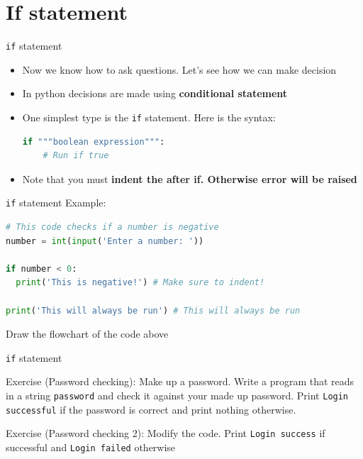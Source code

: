 \documentclass[10pt,xcolor={table,dvipsnames},t]{beamer}
\begin{document}
\section{If statement}
\begin{frame}[fragile]{\texttt{if} statement}
  \begin{itemize}
    \item Now we know how to ask questions. Let's see how we can make decision
    \item In python decisions are made using \textbf{conditional statement}
    \item One simplest type is the \texttt{if} statement. Here is the syntax:
\begin{lstlisting}[language=python]
  if """boolean expression""":
    # Run if true
\end{lstlisting}
    \item Note that you must \textbf{indent the after if. Otherwise error will be raised}
  \end{itemize}
\end{frame}

\begin{frame}[fragile]{\texttt{if} statement}
  Example:
\begin{lstlisting}[language=python]
# This code checks if a number is negative
number = int(input('Enter a number: '))

if number < 0:
  print('This is negative!') # Make sure to indent!

print('This will always be run') # This will always be run
\end{lstlisting}
Draw the flowchart of the code above
\end{frame}
\begin{frame}{\texttt{if} statement}
  \begin{exampleblock}{Exercise (Password checking):}
    Make up a password. Write a program that reads in a string \texttt{password} and check it against your made up password. Print \texttt{Login successful} if the password is correct and print nothing otherwise.
  \end{exampleblock}
  \begin{exampleblock}{Exercise (Password checking 2):}
    Modify the code. Print \texttt{Login success} if successful and \texttt{Login failed} otherwise
  \end{exampleblock}
\end{frame}
\end{document}
